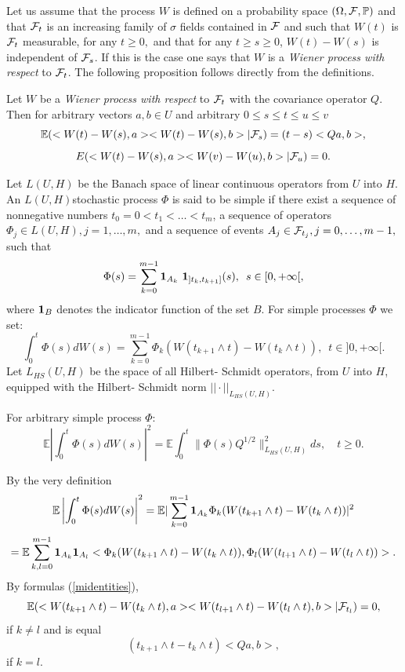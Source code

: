 \documentclass[preprint]{imsart}
\def\P{\mathbb P}
\def\E{\mathbb E}
\begin{document}
{\noindent Let us assume that the process $W$ is defined on a probability space
$(\Omega, \cal F, \P)$ and that ${\cal F}_t$ is an increasing family of $\sigma $ fields contained in $\cal F$ and such
that $W(t)$ is ${\cal F}_t$ measurable, for any $t\geq 0,$ and that for any $t\geq s\geq 0$, $W(t) - W(s)$ is independent of
${\cal F}_s$. If this is the case one says that $W$ is a {\it Wiener process with respect} to ${\cal F}_t$. The following
proposition follows directly from the definitions.
\begin{Proposition}\label{midentities}
Let $W$ be a {\it Wiener process with respect} to ${\cal F}_t$ with the covariance operator $Q$. Then
for arbitrary vectors $a, b \in U$ and arbitrary $0\leq s \leq t \leq u \leq v$
\begin{equation}
\E (<W(t) - W(s), a> <W(t) - W(s), b> |{\cal F}_s) = (t- s)<Q a, b>,
\end{equation}
\begin{equation}
E (<W(t) - W(s), a> <W(v) - W(u), b> |{\cal F}_u)= 0.
\end{equation}
\end{Proposition}
Let $L(U, H)$ be the Banach  space of linear continuous operators from $U$ into $H$.  An $L(U, H)$stochastic process $\Phi $
 is said to be simple if there
exist a   sequence of nonnegative numbers  $t_{0}= 0 <t_1 < \ldots < t_m$,  a sequence of operators $\Phi_{j}\in L(U, H),
j= 1, \ldots, m,$
and  a sequence of events $ A_j\in {\cal F}_{t_j}, j= 0, \ldots, m-1, $ such that
$$
\Phi (s) = \sum_{k= 0}^{m- 1} {\bf 1}_{A_k}\,\,{\bf 1}_{]t_k, t_{k+ 1}]}(s),\,\,\,s\in [0, +\infty [,
$$
where  ${\bf 1}_{B}$ denotes the indicator function of the set $B$. For simple processes $\Phi$ we set:
$$
\int_0^t \Phi(s) dW(s)= \sum_{k= 0}^{m- 1} \Phi_{k} (W(t_{k+ 1}\wedge t)- W(t_{k }\wedge t)),\,\,\,t\in ]0,+\infty [.
$$
Let $L_{HS}(U,H) $ be the space of all Hilbert- Schmidt operators, from $U$ into $H$, equipped with
the Hilbert- Schmidt norm $||\cdot ||_{L_{HS}(U, H) }$.

\begin{Proposition}\label{isometricW}
For arbitrary simple process $\Phi$:
$$
\E \left| \int_0^t \Phi(s)dW(s) \right|^2 =
    \E \int_0^t \|\Phi(s)Q^{1/2} \|^2_{L_{HS}(U,H)} ds,
    \quad t \geq 0.
$$
\end{Proposition}
By the very definition
$$
\E \left| \int_0^t \Phi(s)dW(s) \right|^2 = \E |\sum_{k= 0}^{m- 1} {\bf 1}_{A_k}
\Phi_{k} (W(t_{k+ 1}\wedge t)- W(t_{k }\wedge t))|^2
$$
$$
= \E \sum_{k, l= 0}^{m- 1}{\bf 1}_{A_k}{\bf 1}_{A_l}<\Phi_{k}(W(t_{k+ 1}\wedge t)- W(t_{k }\wedge t)), \Phi_{l}
(W(t_{l+ 1}\wedge t)- W(t_{l }\wedge t))>.
$$
By formulas (\ref{midentities}),
\begin{equation}\label{midentities1}
\E (<W(t_{k+ 1}\wedge t)- W(t_{k }\wedge t), a> <W(t_{l+ 1}\wedge t)- W(t_{l}\wedge t), b>|{\cal F}_{t_{l}})=0,
\end{equation}
if $k\neq l$ and is equal
\begin{equation}\label{midentities2}
(t_{k+ 1}\wedge t - t_{k }\wedge t) <Q a, b>,
\end{equation}
if $k= l$.


}
\end{document}
